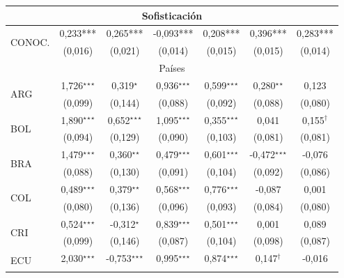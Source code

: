 \documentclass[a4paper]{tufte-handout}
\begin{document}
\begin{table}[h]
\begin{tabular}{l c c c c c c}
    \multicolumn{7}{c}{Sofisticación} \\ \midrule
    \multirow{2}{*}{CONOC.} & 0,233*** & 0,265*** & -0,093*** & 0,208*** & 0,396*** & 0,283*** \\
    & {\scriptsize (0,016)} & {\scriptsize (0,021)} & {\scriptsize (0,014)} & {\scriptsize (0,015)} & {\scriptsize (0,015)} & {\scriptsize (0,014)} \\ \midrule
    \multicolumn{7}{c}{Países} \\ \midrule
    \multirow{2}{*}{ARG} & 1,726$^\star$$^\star$$^\star$ & 0,319$^\star$ & 0,936$^\star$$^\star$$^\star$ & 0,599$^\star$$^\star$$^\star$ & 0,280$^\star$$^\star$ & 0,123 \\
    & {\scriptsize (0,099)} & {\scriptsize (0,144)} & {\scriptsize (0,088)} & {\scriptsize (0,092)} & {\scriptsize (0,088)} & {\scriptsize (0,080)} \\
    \multirow{2}{*}{BOL} & 1,890$^\star$$^\star$$^\star$ & 0,652$^\star$$^\star$$^\star$ & 1,095$^\star$$^\star$$^\star$ & 0,355$^\star$$^\star$$^\star$ & 0,041 & 0,155$^\dagger$ \\
    & {\scriptsize (0,094)} & {\scriptsize (0,129)} & {\scriptsize (0,090)} & {\scriptsize (0,103)} & {\scriptsize (0,081)} & {\scriptsize (0,081)} \\
    \multirow{2}{*}{BRA} & 1,479$^\star$$^\star$$^\star$ & 0,360$^\star$$^\star$ & 0,479$^\star$$^\star$$^\star$ & 0,601$^\star$$^\star$$^\star$ & -0,472$^\star$$^\star$$^\star$ & -0,076 \\
    & {\scriptsize (0,088)} & {\scriptsize (0,130)} & {\scriptsize (0,091)} & {\scriptsize (0,104)} & {\scriptsize (0,092)} & {\scriptsize (0,086)} \\
    \multirow{2}{*}{COL} & 0,489$^\star$$^\star$$^\star$ & 0,379$^\star$$^\star$ & 0,568$^\star$$^\star$$^\star$ & 0,776$^\star$$^\star$$^\star$ & -0,087 & 0,001 \\
    & {\scriptsize (0,080)} & {\scriptsize (0,136)} & {\scriptsize (0,096)} & {\scriptsize (0,093)} & {\scriptsize (0,084)} & {\scriptsize (0,080)} \\
    \multirow{2}{*}{CRI} & 0,524$^\star$$^\star$$^\star$ & -0,312$^\star$ & 0,839$^\star$$^\star$$^\star$ & 0,501$^\star$$^\star$$^\star$ & 0,001 & 0,089 \\
    & {\scriptsize (0,099)} & {\scriptsize (0,146)} & {\scriptsize (0,087)} & {\scriptsize (0,104)} & {\scriptsize (0,098)} & {\scriptsize (0,087)} \\
    \multirow{2}{*}{ECU} & 2,030$^\star$$^\star$$^\star$ & -0,753$^\star$$^\star$$^\star$ & 0,995$^\star$$^\star$$^\star$ & 0,874$^\star$$^\star$$^\star$ & 0,147$^\dagger$ & -0,016 \\
$$
\end{tabular}
\end{table}
\end{document}
